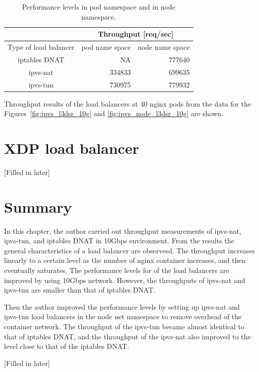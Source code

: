 \begin{table}[h]
  \centering
  \begin{tabular}{|l|r|r|}
    \hline
    & \multicolumn{2}{c|}{Throughput {[}req/sec{]}} \\ \hline
    Type of load balancer & \multicolumn{1}{c|}{pod name space} & \multicolumn{1}{c|}{node name space} \\ \hline
    \multicolumn{1}{|c|}{iptables DNAT} & NA & \cellcolor[HTML]{ECF4FF}777640 \\ \hline
    \multicolumn{1}{|c|}{ipvs-nat} & \cellcolor[HTML]{ECF4FF}334833 & \cellcolor[HTML]{FFF3F3}699635 \\ \hline
    \multicolumn{1}{|c|}{ipvs-tun} & \cellcolor[HTML]{ECF4FF}730975 & \cellcolor[HTML]{FFF3F3}779932 \\ \hline
  \end{tabular}
  \caption{Performance levels in pod namespace and in node namespace.}
  \raggedright
  Throughput results of the load balancers at 40 nginx pods from the data for the Figures~\ref{fig:ipvs_l3dsr_10g} and \ref{fig:ipvs_node_l3dsr_10g} are shown.
  \label{table:nat_tun_dnat_pod_node}
\end{table}

\FloatBarrier
\section{XDP load balancer}
[Filled in later]


\section{Summary}

In this chapter, the author carried out throughput measurements of ipvs-nat, ipvs-tun, and iptables DNAT in 10Gbps environment.
From the results the general characteristics of a load balancer are observesd.
The throughput increases linearly to a certain level as the number of nginx container increases, and then eventually saturates.
The performance levels for of the load balancers are improved by using 10Gbps network.
However, the throughputs of ipvs-nat and ipvs-tun are smaller than that of iptables DNAT.

Then the author improved the performance levels by setting up ipvs-nat and ipvs-tun load balancers in the node net namespace to remove overhead of the container network.
The throughput of the ipvs-tun became almost identical to that of iptables DNAT, and the throughput of the ipvs-nat also improved to the level close to that of the iptables DNAT.

[Filled in later]



